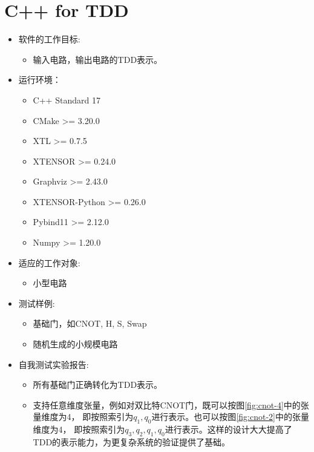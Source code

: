 \documentclass{article}
\begin{document}
\section{C++ for TDD}
\begin{itemize}[leftmargin=*]
    \item 软件的工作目标: 
    \begin{itemize}
        \item 输入电路，输出电路的TDD表示。
    \end{itemize}
    \item 运行环境： 
    \begin{itemize}
        \item C++ Standard 17
        \item CMake >= 3.20.0
        \item XTL >= 0.7.5
        \item XTENSOR >= 0.24.0
        \item Graphviz >= 2.43.0
        \item XTENSOR-Python >= 0.26.0
        \item Pybind11 >= 2.12.0
        \item Numpy >= 1.20.0
    \end{itemize} 
    \item 适应的工作对象:
    \begin{itemize}
        \item 小型电路
    \end{itemize}
    \item 测试样例:
    \begin{itemize}
        \item 基础门，如CNOT, H, S, Swap
        \item 随机生成的小规模电路
    \end{itemize}
    \item 自我测试实验报告:
    \begin{itemize}
        \item 所有基础门正确转化为TDD表示。
        \item 支持任意维度张量，例如对双比特CNOT门，既可以按图\ref{fig:cnot-4}中的张量维度为4，
        即按照索引为$q_1,q_0$进行表示。也可以按图\ref{fig:cnot-2}中的张量维度为4，
        即按照索引为$q_3,q_2,q_1,q_0$进行表示。这样的设计大大提高了TDD的表示能力，为更复杂系统的验证提供了基础。
        \begin{figure}[!htbp]
            \centering
            \begin{subfigure}[b]{.4\textwidth}
                \centering

\end{subfigure}
\end{figure}
\end{itemize}
\end{itemize}
\end{document}
